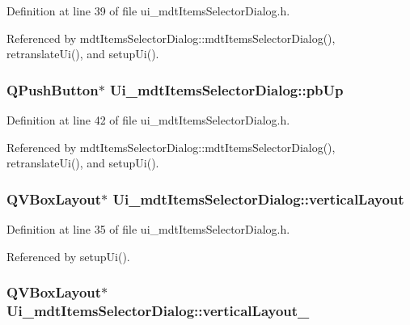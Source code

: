 Definition at line 39 of file ui\-\_\-mdt\-Items\-Selector\-Dialog.\-h.



Referenced by mdt\-Items\-Selector\-Dialog\-::mdt\-Items\-Selector\-Dialog(), retranslate\-Ui(), and setup\-Ui().

\hypertarget{class_ui__mdt_items_selector_dialog_a839d192517bfb238a497bbe27b5a9234}{
\subsubsection[{pb\-Up}]{\setlength{\rightskip}{0pt plus 5cm}Q\-Push\-Button$\ast$ Ui\-\_\-mdt\-Items\-Selector\-Dialog\-::pb\-Up}}\label{class_ui__mdt_items_selector_dialog_a839d192517bfb238a497bbe27b5a9234}


Definition at line 42 of file ui\-\_\-mdt\-Items\-Selector\-Dialog.\-h.



Referenced by mdt\-Items\-Selector\-Dialog\-::mdt\-Items\-Selector\-Dialog(), retranslate\-Ui(), and setup\-Ui().

\hypertarget{class_ui__mdt_items_selector_dialog_a11c12aaac1f31c83dcb4d3538a9f2e43}{
\subsubsection[{vertical\-Layout}]{\setlength{\rightskip}{0pt plus 5cm}Q\-V\-Box\-Layout$\ast$ Ui\-\_\-mdt\-Items\-Selector\-Dialog\-::vertical\-Layout}}\label{class_ui__mdt_items_selector_dialog_a11c12aaac1f31c83dcb4d3538a9f2e43}


Definition at line 35 of file ui\-\_\-mdt\-Items\-Selector\-Dialog.\-h.



Referenced by setup\-Ui().

\hypertarget{class_ui__mdt_items_selector_dialog_a0d1b81d0206eb0f79c4a5cdcce9d8075}{
\subsubsection[{vertical\-Layout\-\_\-2}]{\setlength{\rightskip}{0pt plus 5cm}Q\-V\-Box\-Layout$\ast$ Ui\-\_\-mdt\-Items\-Selector\-Dialog\-::vertical\-Layout\-\_}}\label{class_ui__mdt_items_selector_dialog_a0d1b81d0206eb0f79c4a5cdcce9d8075}


